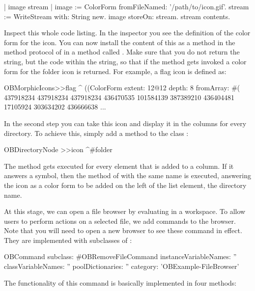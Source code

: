 \documentclass[a4paper,10pt,twoside]{book}
\begin{document}
\begin{code}{}
| image stream |
image := ColorForm fromFileNamed: '/path/to/icon.gif'.
stream := WriteStream with: String new.
image storeOn: stream.
stream contents.
\end{code}

Inspect this whole code listing. In the inspector you see the definition of the color form for the icon. You can now install the content of this  as a method in the method protocol  of  in a method called . Make sure that you do not return the string, but the code within the string, so that if the method gets invoked a color form for the folder icon is returned. For example, a flag icon is defined as:

\begin{code}{}
OBMorphicIcons>>flag
	^ ((ColorForm
		extent: 12@12
		depth: 8
		fromArray: #( 437918234 437918234 437918234 436470535 101584139 387389210 436404481 17105924 303634202 436666638 ...
\end{code}

In the second step you can take this icon and display it in the columns for every directory. To achieve this, simply add a method  to the class :

\begin{code}{}
OBDirectoryNode >>icon
	^#folder
\end{code}

The method  gets executed for every element that is added to a column. If it answers a symbol, then the method of  with the same name is executed, answering the icon as a color form to be added on the left of the list element, \ie the directory name.

At this stage, we can open a file browser by evaluating  in a workspace. To allow users to perform actions on a selected file, we add commands to the browser. Note that you will need to open a new browser to see these command in effect. They are implemented with subclasses of :

\begin{code}{}
OBCommand subclass: #OBRemoveFileCommand
     instanceVariableNames: ''
     classVariableNames: ''
     poolDictionaries: ''
     category: 'OBExample-FileBrowser'
\end{code}


The functionality of this command is basically implemented in four methods: 
\end{document}
